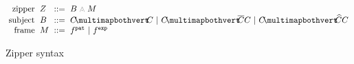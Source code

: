 \begin{figure}
  \[\arraycolsep=3pt\begin{array}{rlrl}
      \text{zipper} & \zip & ::= & \zipper{\subject}{\zframe} \\
      \text{subject} & \subject & ::= &
        \pointing{\selection}{\selection} ~\vert~
        \selecting{\selection}{\selection}{\selection} ~\vert~
        \restructuring{\selection}{\selection}{\selection} \\
      \text{frame} & \zframe & ::= &
        \tfrelem^{\pat} ~\vert~ \tfrelem^{\expr}
 \end{array}\]
  \caption{
    Zipper syntax
  }
  \label{fig:zipper-syntax}
\end{figure}
